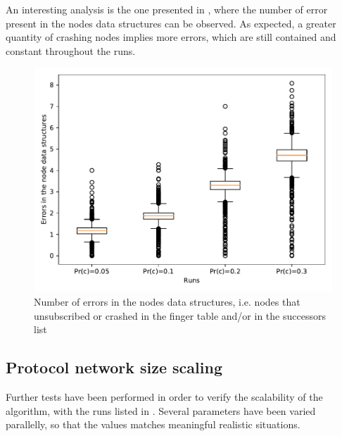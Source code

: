 \documentclass[11pt,twocolumn,letterpaper]{article}
\begin{document}
		An interesting analysis is the one presented in , where the number of error present in the nodes data structures can be observed. As expected, a greater quantity of crashing nodes implies more errors, which are still contained and constant throughout the runs.
		
		\begin{figure}[!h]
			\centering
			\includegraphics[width=\linewidth,clip,trim=0 0.5cm 0 0.35cm]{figures/analysis1/errors_box.pdf}
			\caption{Number of errors in the nodes data structures, i.e. nodes that unsubscribed or crashed in the finger table and/or in the successors list}
			\label{fig:crash7}
		\end{figure}
	
	\subsection{Protocol network size scaling}
	\label{subsec:netsize_analysis}
	Further tests have been performed in order to verify the scalability of the algorithm, with the runs listed in . Several parameters have been varied parallelly, so that the values matches meaningful realistic situations. 
		
\end{document}
